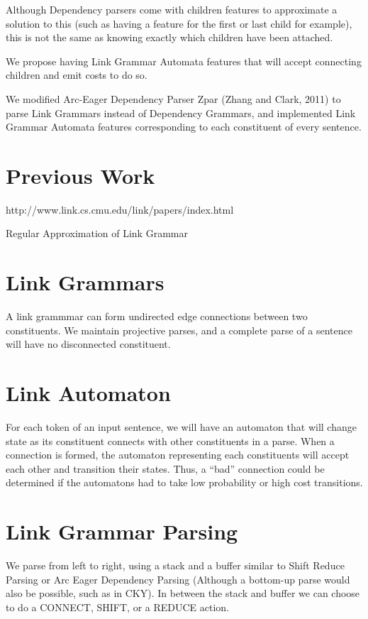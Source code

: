 \documentclass[11pt]{article}
\begin{document}
Although Dependency parsers come with children features to approximate a solution to this (such as having a feature for the first or last child for example), this is not the same as knowing exactly which children have been attached. 


We propose having Link Grammar Automata features that will accept connecting children and emit costs to do so.

We modified Arc-Eager Dependency Parser Zpar (Zhang and Clark, 2011) to parse Link Grammars instead of Dependency Grammars, and implemented Link Grammar Automata features corresponding to each constituent of every sentence.





\section{Previous Work}

http://www.link.cs.cmu.edu/link/papers/index.html

Regular Approximation of Link Grammar

\section{Link Grammars}
A link grammmar can form undirected edge connections between two constituents. 
We maintain projective parses, and a complete parse of a sentence will have no disconnected constituent.

\section{Link Automaton}
For each token of an input sentence, we will have an automaton that will change state as its constituent connects with other constituents in a parse. When a connection is formed, the automaton representing each constituents will accept each other and transition their states. Thus, a ``bad'' connection could be determined if the automatons had to take low probability or high cost transitions.

\section{Link Grammar Parsing}
We parse from left to right, using a stack and a buffer similar to Shift Reduce Parsing or Arc Eager Dependency Parsing (Although a bottom-up parse would also be possible, such as in CKY). In between the stack and buffer we can choose to do a CONNECT, SHIFT, or a REDUCE action. 
\end{document}
